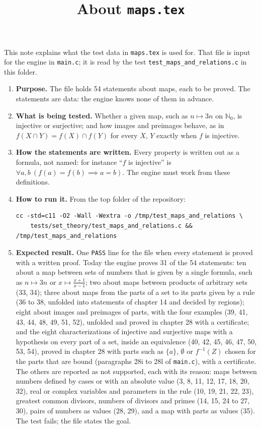 \documentclass[11pt,a4paper]{article}
\title{About \texttt{maps.tex}}
\author{}
\date{}
\begin{document}
\maketitle
This note explains what the test data in \texttt{maps.tex} is used for. That file is input for the engine in \texttt{main.c}; it is read by the test \texttt{test\_maps\_and\_relations.c} in this folder.

\begin{enumerate}
\item \textbf{Purpose.} The file holds 54 statements about maps, each to be proved. The statements are data: the engine knows none of them in advance.

\item \textbf{What is being tested.} Whether a given map, such as $n \mapsto 3n$ on $\mathbb{N}_{0}$, is injective or surjective; and how images and preimages behave, as in $f(X \cap Y) = f(X) \cap f(Y)$ for every $X$, $Y$ exactly when $f$ is injective.

\item \textbf{How the statements are written.} Every property is written out as a formula, not named: for instance ``$f$ is injective'' is $\forall a, b\ (f(a) = f(b) \implies a = b)$. The engine must work from these definitions.

\item \textbf{How to run it.} From the top folder of the repository:
\begin{verbatim}
cc -std=c11 -O2 -Wall -Wextra -o /tmp/test_maps_and_relations \
    tests/set_theory/test_maps_and_relations.c && /tmp/test_maps_and_relations
\end{verbatim}

\item \textbf{Expected result.} One \texttt{PASS} line for the file when every statement is proved with a written proof. Today the engine proves 31 of the 54 statements: ten about a map between sets of numbers that is given by a single formula, such as $n \mapsto 3n$ or $x \mapsto \frac{x + 1}{x - 1}$; two about maps between products of arbitrary sets (33, 34); three about maps from the parts of a set to its parts given by a rule (36 to 38, unfolded into statements of chapter 14 and decided by regions); eight about images and preimages of parts, with the four examples (39, 41, 43, 44, 48, 49, 51, 52), unfolded and proved in chapter 28 with a certificate; and the eight characterizations of injective and surjective maps with a hypothesis on every part of a set, inside an equivalence (40, 42, 45, 46, 47, 50, 53, 54), proved in chapter 28 with parts such as $\{a\}$, $\emptyset$ or $f^{-1}(Z)$ chosen for the parts that are bound (paragraphs 28i to 28l of \texttt{main.c}), with a certificate. The others are reported as not supported, each with its reason: maps between numbers defined by cases or with an absolute value (3, 8, 11, 12, 17, 18, 20, 32), real or complex variables and parameters in the rule (10, 19, 21, 22, 23), greatest common divisors, numbers of divisors and primes (14, 15, 24 to 27, 30), pairs of numbers as values (28, 29), and a map with parts as values (35). The test fails; the file states the goal.
\end{enumerate}
\end{document}
